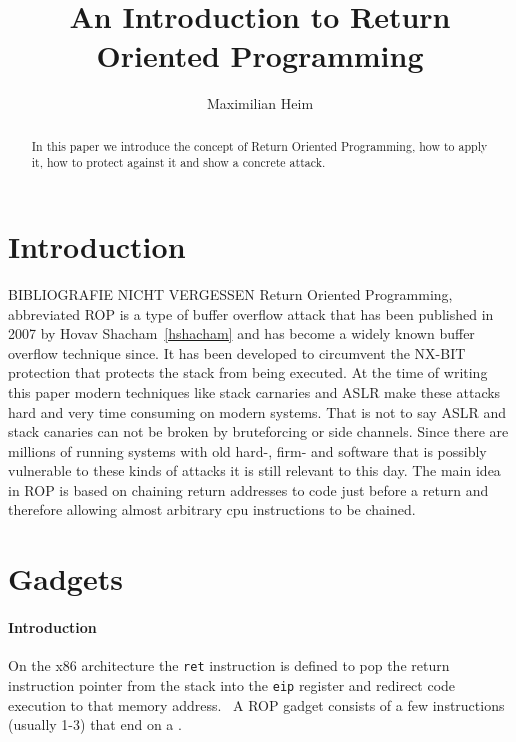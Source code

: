 \documentclass[journal=tosc,submission, notanonymous]{iacrtrans}
\author{Maximilian Heim\inst{1}}
\institute{
  University Albstadt-Sigmaringen, Albstadt, Germany, \email{MaximilianHeim@protonmail.com}
}
\title{An Introduction to Return Oriented Programming}
\begin{document}
\maketitle




\begin{abstract}
  In this paper we introduce the concept of Return Oriented Programming, how to apply it, how to protect against it and show a concrete attack.
\end{abstract}


\section{Introduction}
BIBLIOGRAFIE NICHT VERGESSEN
Return Oriented Programming, abbreviated ROP is a type of buffer overflow attack that has been published in 2007 by Hovav Shacham~\cref{hshacham} and has become a widely known buffer overflow technique since. It has been developed to circumvent the NX-BIT protection that protects the stack from being executed. At the time of writing this paper modern techniques like stack carnaries and ASLR make these attacks hard and very time consuming on modern systems. That is not to say ASLR and stack canaries can not be broken by bruteforcing or side channels. Since there are millions of running systems with old hard-, firm- and software that is possibly vulnerable to these kinds of attacks it is still relevant to this day. The main idea in ROP is based on chaining return addresses to code just before a return and therefore allowing almost arbitrary cpu instructions to be chained.


\section{Gadgets}
\label{sec:gadgets}
\paragraph{Introduction}
On the x86 architecture the \Verb+ret+ instruction is defined to pop the return instruction pointer from the stack into the \Verb+eip+ register and redirect code execution to that memory address.~\cite{retx86} A ROP gadget consists of a few instructions (usually 1-3) that end on a .
\end{document}
